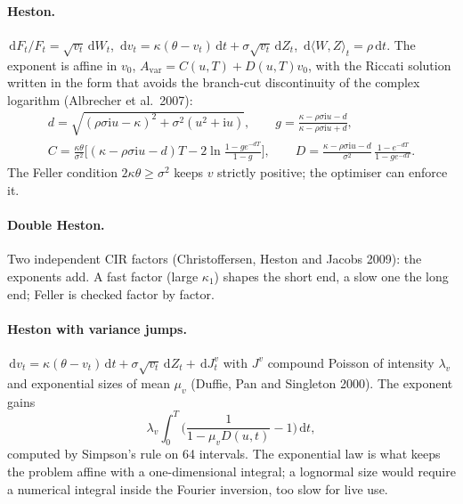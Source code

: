 \documentclass[11pt,a4paper]{article}
\theoremstyle{definition}
\theoremstyle{remark}
\newcommand{\dd}{\,\mathrm{d}}
\newcommand{\ii}{\mathrm{i}}
\begin{document}
\paragraph{Heston.} $\dd F_t/F_t=\sqrt{v_t}\dd W_t$, $\dd v_t=\kappa(\theta-v_t)\dd t+\sigma\sqrt{v_t}\dd Z_t$, $\dd\langle W,Z\rangle_t=\rho\dd t$.
The exponent is affine in $v_0$, $A_{\mathrm{var}}=C(u,T)+D(u,T)v_0$, with the Riccati solution written in the form that avoids
the branch-cut discontinuity of the complex logarithm (Albrecher et al.\ 2007):
\begin{gather}
  d=\sqrt{(\rho\sigma\ii u-\kappa)^2+\sigma^2(u^2+\ii u)},\qquad g=\frac{\kappa-\rho\sigma\ii u-d}{\kappa-\rho\sigma\ii u+d},\\
  C=\frac{\kappa\theta}{\sigma^2}\Big[(\kappa-\rho\sigma\ii u-d)T-2\ln\frac{1-ge^{-dT}}{1-g}\Big],\qquad
  D=\frac{\kappa-\rho\sigma\ii u-d}{\sigma^2}\,\frac{1-e^{-dT}}{1-ge^{-dT}} .
\end{gather}
The Feller condition $2\kappa\theta\ge\sigma^2$ keeps $v$ strictly positive; the optimiser can enforce it.
\paragraph{Double Heston.} Two independent CIR factors (Christoffersen, Heston and Jacobs 2009): the exponents add. A fast factor
(large $\kappa_1$) shapes the short end, a slow one the long end; Feller is checked factor by factor.
\paragraph{Heston with variance jumps.} $\dd v_t=\kappa(\theta-v_t)\dd t+\sigma\sqrt{v_t}\dd Z_t+\dd J^v_t$ with $J^v$ compound
Poisson of intensity $\lambda_v$ and exponential sizes of mean $\mu_v$ (Duffie, Pan and Singleton 2000). The exponent gains
\begin{equation}
  \lambda_v\int_0^T\Big(\frac{1}{1-\mu_vD(u,t)}-1\Big)\dd t,
\end{equation}
computed by Simpson's rule on 64 intervals. The exponential law is what keeps the problem affine with a one-dimensional
integral; a lognormal size would require a numerical integral inside the Fourier inversion, too slow for live use.
\end{document}

